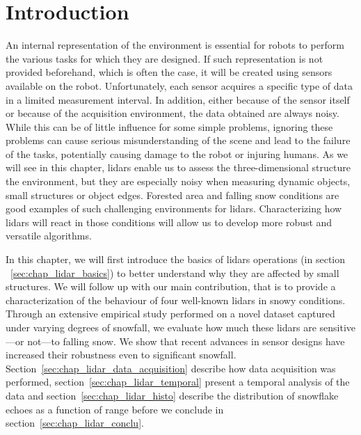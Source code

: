 \section{Introduction}
\label{sec:chap_lidar_intro}

An internal representation of the environment is essential for robots to perform the various tasks for which they are designed. If such representation is not provided beforehand, which is often the case, it will be created using sensors available on the robot. Unfortunately, each sensor acquires a specific type of data in a limited measurement interval. In addition, either because of the sensor itself or because of the acquisition environment, the data obtained are always noisy. While this can be of little influence for some simple problems, ignoring these problems can cause serious misunderstanding of the scene and lead to the failure of the tasks, potentially causing damage to the robot or injuring humans. As we will see in this chapter, \gls*{lidar}s enable us to assess the three-dimensional structure the environment, but they are especially noisy when measuring dynamic objects, small structures or object edges. Forested area and falling snow conditions are good examples of such challenging environments for \gls*{lidar}s. Characterizing how \gls*{lidar}s will react in those conditions will allow us to develop more robust and versatile algorithms.

In this chapter, we will first introduce the basics of \gls*{lidar}s operations (in section ~\ref{sec:chap_lidar_basics}) to better understand why they are affected by small structures. We will follow up with our main contribution, that is to provide a characterization of the behaviour of four well-known \gls*{lidar}s in snowy conditions. Through an extensive empirical study performed on a novel dataset captured under varying degrees of snowfall, we evaluate how much these \gls*{lidar}s are sensitive---or not---to falling snow. We show that recent advances in sensor designs have increased their robustness even to significant snowfall. Section~\ref{sec:chap_lidar_data_acquisition} describe how data acquisition was performed, section~\ref{sec:chap_lidar_temporal} present a temporal analysis of the data and section~\ref{sec:chap_lidar_histo} describe the distribution of snowflake echoes as a function of range before we conclude in section~\ref{sec:chap_lidar_conclu}. 

